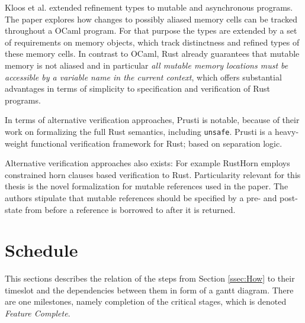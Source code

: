\documentclass[11pt]{article}
\newcommand{\code}[1]{\texttt{#1}}
\begin{document}
Kloos et al. \cite{kloos_asynchronous_2015} extended refinement types to mutable and asynchronous programs. The paper explores how changes to possibly aliased memory cells can be tracked throughout a OCaml program. For that purpose the types are extended by a set of requirements on memory objects, which track distinctness and refined types of these memory cells. In contrast to OCaml, Rust already guarantees that mutable memory is not aliased and in particular \textit{all mutable memory locations must be accessible by a variable name in the current context}, which offers substantial advantages in terms of simplicity to specification and verification of Rust programs.

In terms of alternative verification approaches, Prusti\cite{astrauskas_leveraging_2019} is notable, because of their work on formalizing the full Rust semantics, including \code{unsafe}. Prusti is a heavy-weight functional verification framework for Rust; based on separation logic.

Alternative verification approaches also exists: For example RustHorn\cite{matsushita_rusthorn_2020} employs constrained horn clauses based verification to Rust. Particularity relevant for this thesis is the novel formalization for mutable references used in the paper. The authors stipulate that mutable references should be specified by a pre- and post-state from before a reference is borrowed to after it is returned.

\section{Schedule} \label{sec:schedule}

This sections describes the relation of the steps from Section \ref{ssec:How} to their timeslot and the dependencies between them in form of a gantt diagram. There are one milestones, namely completion of the critical stages, which is denoted \textit{Feature Complete}.
\end{document}
